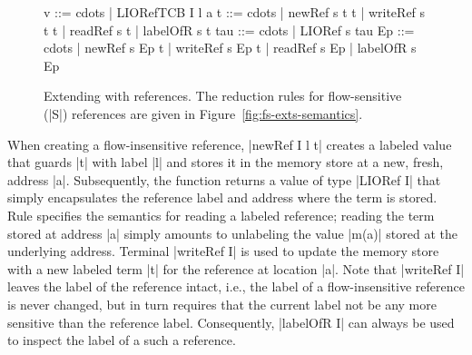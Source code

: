 \begin{figure}[t]
\small
\begin{code}
v    ::= cdots  | LIORefTCB I l a
t    ::= cdots  | newRef s t t | writeRef s t t | readRef s t
                | labelOfR s t
tau  ::= cdots  | LIORef s tau
Ep   ::= cdots  | newRef s Ep t | writeRef s Ep t | readRef s Ep 
                | labelOfR s Ep
\end{code}

\caption{Extending \lio{} with references. The reduction rules for
flow-sensitive (|S|) references are given in Figure~\ref{fig:fs-exts-semantics}.
\label{fig:sos:refs}}
\end{figure}

%
When creating a flow-insensitive reference, |newRef I l t| creates a labeled
value that guards |t| with label |l| and stores it in the memory store at a
new, fresh, address |a|.
%
Subsequently, the function returns a value of type |LIORef I| that simply
encapsulates the reference label and address where the term is stored.
%
Rule  specifies the semantics for reading a
labeled reference; reading the term stored at address |a| simply
amounts to unlabeling the value |m(a)| stored at the underlying
address.
%
Terminal |writeRef I| is used to update the memory store with a new labeled term
|t| for the reference at location |a|.
%
Note that |writeRef I| leaves the label of the reference intact, i.e., the
label of a flow-insensitive reference is never changed, but in turn requires
that the current label not be any more sensitive than the reference label.
%
Consequently, |labelOfR I| can always be used to inspect the label of a such a
reference.
%

